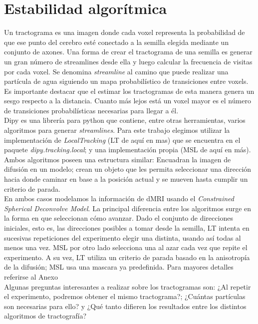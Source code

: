 \section{Estabilidad algor\'itmica}
\label{sec:estabilidad}

Un tractograma es una imagen donde cada voxel representa la probabilidad de que
ese punto del cerebro est\'e conectado a la semilla elegida mediante un conjunto
de axones. Una forma de crear el tractograma de una semilla es generar un gran
n\'umero de streamlines desde ella y luego calcular la frecuencia de visitas por
cada voxel. Se denomina \textit{streamline} al camino que puede realizar una
part\'icula de agua siguiendo un mapa probabil\'istico de transiciones entre voxels.
Es importante destacar que el estimar los tractogramas de esta manera genera un 
sesgo respecto a la distancia. Cuanto m\'as lejos est\'a un voxel mayor es el 
n\'umero de transiciones probabil\'isticas necesarias para llegar a \'el. \\

Dipy es una librer\'ia para python que contiene, entre otras herramientas,
varios algoritmos para generar \textit{streamlines}. Para este trabajo elegimos
utilizar la implementaci\'on de \textit{LocalTracking} (LT de aqu\'i en mas) que
se encuentra en el paquete \textit{dipy.tracking.local}; y una implementaci\'on 
propia (MSL de aqu\'i en m\'as). Ambos algoritmos poseen una estructura 
similar: Encuadran la imagen de difusi\'on en un modelo; crean un objeto que les
permita seleccionar una direcci\'on hacia donde caminar en base a la posici\'on
actual y se mueven hasta cumplir un criterio de parada.\\

En ambos casos modelamos la informaci\'on de dMRI usando el \textit{Constrained
Spherical Deconvolve Model}. La principal diferencia entre los algoritmos surge
en la forma en que seleccionan c\'omo avanzar. Dado el conjunto de direcciones 
iniciales, esto es, las direcciones posibles a tomar desde la semilla,
LT intenta en sucesivas repeticiones del experimento elegir una distinta, 
usando as\'i todas al menos una vez. MSL por otro lado selecciona una al
azar cada vez que repite el experimento. A su vez, LT utiliza un criterio de 
parada basado en la anisotrop\'ia de la difusi\'on; MSL usa una mascara ya 
predefinida. Para mayores detalles referirse al Anexo\\

Algunas preguntas interesantes a realizar sobre los tractogramas son: ¿Al repetir
el experimento, podremos obtener el mismo tractograma?; ¿Cu\'antas part\'iculas son
necesarias para ello? y ¿Qu\'e tanto difieren los resultados entre los distintos 
algoritmos de tractograf\'ia?\\

